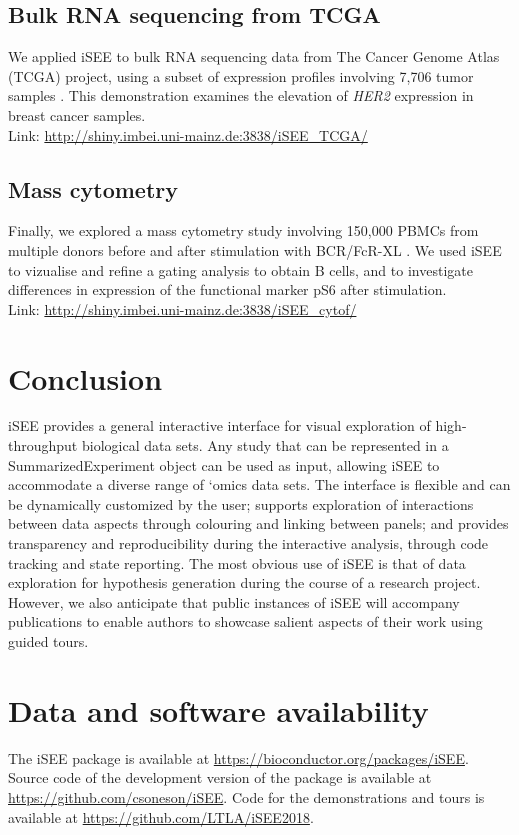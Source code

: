 \documentclass[10pt,a4paper,twocolumn]{article}
\begin{document}
\subsection*{Bulk RNA sequencing from TCGA}
We applied iSEE to bulk RNA sequencing data from The Cancer Genome Atlas (TCGA) project, using a subset of expression profiles involving 7,706 tumor samples \citep{piccolo2015TCGA}.
This demonstration examines the elevation of \textit{HER2} expression in breast cancer samples.\\

Link: \url{http://shiny.imbei.uni-mainz.de:3838/iSEE_TCGA/}

\subsection*{Mass cytometry}
Finally, we explored a mass cytometry study involving 150,000 PBMCs from multiple donors before and after stimulation with BCR/FcR-XL \citep{bodenmiller2012cytof}.
We used iSEE to vizualise and refine a gating analysis to obtain B cells, and to investigate differences in expression of the functional marker pS6 after stimulation.\\

Link: \url{http://shiny.imbei.uni-mainz.de:3838/iSEE_cytof/}

\section*{Conclusion}
iSEE provides a general interactive interface for visual exploration of high-throughput biological data sets.
Any study that can be represented in a SummarizedExperiment object can be used as input, allowing iSEE to accommodate a diverse range of `omics data sets.
The interface is flexible and can be dynamically customized by the user; supports exploration of interactions between data aspects through colouring and linking between panels;
and provides transparency and reproducibility during the interactive analysis, through code tracking and state reporting. 
The most obvious use of iSEE is that of data exploration for hypothesis generation during the course of a research project.
However, we also anticipate that public instances of iSEE will accompany publications to enable authors to showcase salient aspects of their work using guided tours.

\section*{Data and software availability}
The iSEE package is available at \url{https://bioconductor.org/packages/iSEE}.
Source code of the development version of the package is available at \url{https://github.com/csoneson/iSEE}.
Code for the demonstrations and tours is available at \url{https://github.com/LTLA/iSEE2018}.
\end{document}

